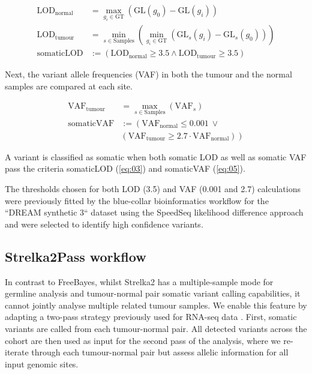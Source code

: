 \begin{align}
\text{LOD}_{\text{normal}} &= \max_{g_i \in \text{GT}} \left( \text{GL}(g_0) - \text{GL}(g_i) \right) \label{eq:01}\\
\text{LOD}_{\text{tumour}} &= \min_{s \in \text{Samples}} \left( \min_{g_i \in \text{GT}} \left( \text{GL}_s(g_i) - \text{GL}_s(g_0) \right) \right) \label{eq:02}\\
\text{somaticLOD} & := \left( \text{LOD}_{\text{normal}} \geq 3.5 \land \text{LOD}_{\text{tumour}} \geq 3.5 \right) \label{eq:03}
\end{align}

Next, the variant allele frequencies (VAF) in both the tumour and the normal samples are compared at each site.


\begin{align}
\text{VAF}_{\text{tumour}} &= \max_{s \in \text{Samples}} ( \text{VAF}_s) \label{eq:04}\\
\text{somaticVAF} & := \left( \text{VAF}_{\text{normal}} \leq 0.001 ~\lor \right. \nonumber \\
 & \left. ( \text{VAF}_{\text{tumour}} \geq 2.7 \cdot \text{VAF}_{\text{normal}}) \right) \label{eq:05}
\end{align}

A variant is classified as somatic when both somatic LOD as well as somatic VAF pass the criteria somaticLOD (\autoref{eq:03}) and somaticVAF (\autoref{eq:05}).

The thresholds chosen for both LOD (3.5) and VAF (0.001 and 2.7) calculations were previously fitted by the blue-collar bioinformatics workflow for the ``DREAM synthetic 3`` dataset using the SpeedSeq likelihood difference approach \parencite{Chapman2020} and were selected to identify high confidence variants.

\subsection{Strelka2Pass workflow}
In contrast to FreeBayes, whilst Strelka2 has a multiple-sample mode for germline analysis and tumour-normal pair somatic variant calling capabilities, it cannot jointly analyse multiple related tumour samples. We enable this feature by adapting a two-pass strategy previously used for RNA-seq data \parencite{Veeneman2015}. First, somatic variants are called from each tumour-normal pair. All detected variants across the cohort are then used as input for the second pass of the analysis, where we re-iterate through each tumour-normal pair but assess allelic information for all input genomic sites.

